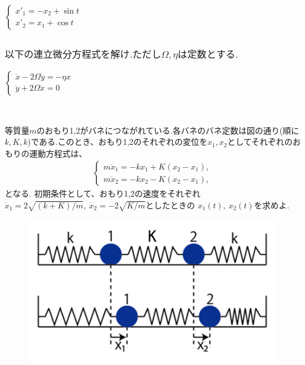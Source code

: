 \documentclass[a4paper,11pt,fleqn]{jarticle}
\begin{document}
\newpage
\subsubsection{}
$\left\{ \begin{array}{l}
{x'}_1=-x_2+\sin t \\
{x'}_2= x_1+\cos t
\end{array} \right.$

\newpage
\subsection{}
\subsubsection{$以下の連立微分方程式を解け.ただし\Omega ,\eta は定数とする.$}
$\left\{ \begin{array}{l}
\ddot{x}-2\Omega \dot{y}=-\eta x  \\
\ddot{y}+2\Omega \dot{x}=0 
\end{array} \right.$
\\
\\

\newpage
\subsection{}
等質量$m$のおもり1,2がバネにつながれている.各バネのバネ定数は図の通り(順に$k,K,k$)である.このとき、おもり1,2のそれぞれの変位を$x_1,x_2$としてそれぞれのおもりの運動方程式は、
\begin{eqnarray*}
\left\{
\begin{array}{l}
m\ddot{x}_1 = -kx_1 + K(x_2-x_1), \\
m\ddot{x}_2 = -kx_2 - K(x_2-x_1),
\end{array}
\right.
\end{eqnarray*}
となる.
初期条件として、おもり1,2の速度をそれぞれ$\dot{x}_1 = 2\sqrt{(k + K)/m},\ \dot{x}_2 = -2\sqrt{K/m}$としたときの
$x_1(t),~x_2(t)$を求めよ.
\begin{figure}[htpb]
\begin{center}
\includegraphics[scale=.20]{bane2.png}
\end{center}
\end{figure}
\end{document}
